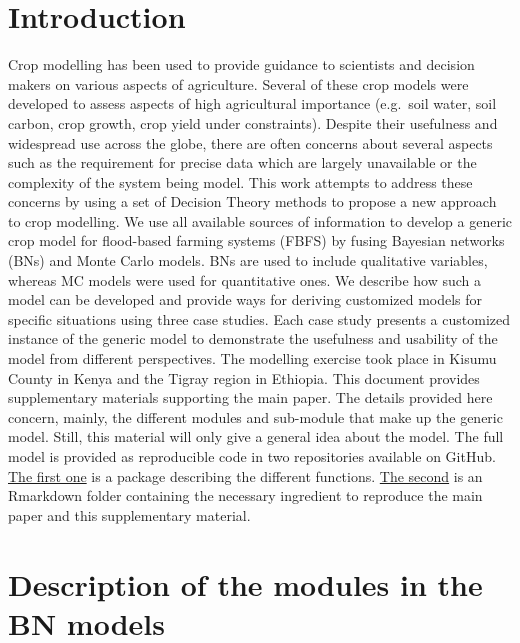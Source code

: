 \documentclass[]{elsarticle} %
\begin{document}
\setcounter{table}{0}  \renewcommand{\thetable}{S\arabic{table}} \setcounter{figure}{0} \renewcommand{\thefigure}{S\arabic{figure}}

\hypertarget{introduction}{%
\section*{Introduction}\label{introduction}}

Crop modelling has been used to provide guidance to scientists and decision makers on various aspects of agriculture. Several of these crop models were developed to assess aspects of high agricultural importance (e.g.~soil water, soil carbon, crop growth, crop yield under constraints). Despite their usefulness and widespread use across the globe, there are often concerns about several aspects such as the requirement for precise data which are largely unavailable or the complexity of the system being model.
This work attempts to address these concerns by using a set of Decision Theory methods to propose a new approach to crop modelling. We use all available sources of information to develop a generic crop model for flood-based farming systems (FBFS) by fusing Bayesian networks (BNs) and Monte Carlo models. BNs are used to include qualitative variables, whereas MC models were used for quantitative ones. We describe how such a model can be developed and provide ways for deriving customized models for specific situations using three case studies. Each case study presents a customized instance of the generic model to demonstrate the usefulness and usability of the model from different perspectives. The modelling exercise took place in Kisumu County in Kenya and the Tigray region in Ethiopia. This document provides supplementary materials supporting the main paper. The details provided here concern, mainly, the different modules and sub-module that make up the generic model. Still, this material will only give a general idea about the model. The full model is provided as reproducible code in two repositories available on GitHub. \href{https://github.com/Issoufou-Liman/decisionSupportExtra}{The first one} is a package describing the different functions. \href{https://github.com/Issoufou-Liman/Modelling_FBFS}{The second} is an Rmarkdown folder containing the necessary ingredient to reproduce the main paper and this supplementary material.

\hypertarget{refs1}{%
\section{Description of the modules in the BN models}\label{refs1}}
\end{document}
